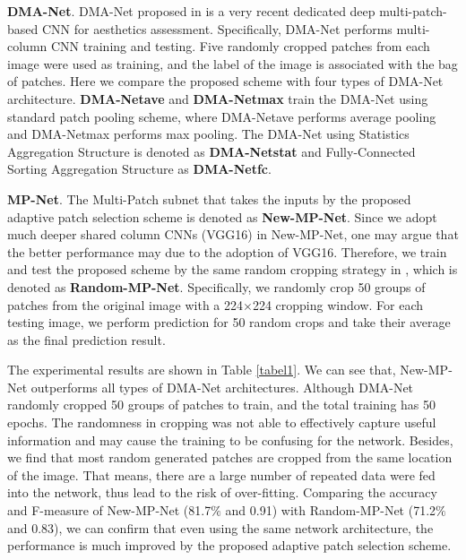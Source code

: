 \documentclass[10pt,twocolumn,letterpaper]{article}
\begin{document}
\textbf{DMA-Net}. DMA-Net proposed in \cite{Lu:2015:ICCV} is a very recent dedicated deep multi-patch-based CNN for aesthetics assessment.
Specifically, DMA-Net performs multi-column CNN training and testing. Five randomly cropped patches from each image were used as training, and the label of the image is associated with the bag of patches. Here we compare the proposed scheme with four types of DMA-Net architecture. \textbf{DMA-Net{\tiny ave}} and \textbf{DMA-Net{\tiny max}} train the DMA-Net using standard patch pooling scheme, where DMA-Net{\tiny ave} performs average pooling and DMA-Net{\tiny max} performs max pooling. The DMA-Net using Statistics Aggregation Structure is denoted as \textbf{DMA-Net{\tiny stat}} and Fully-Connected Sorting Aggregation Structure as \textbf{DMA-Net{\tiny fc}}. 

\textbf{MP-Net}. The Multi-Patch subnet that takes the inputs by the proposed adaptive patch selection scheme is denoted as \textbf{New-MP-Net}. Since we adopt much deeper shared column CNNs (VGG16) in New-MP-Net, one may argue that the better performance may due to the adoption of VGG16. Therefore, we train and test the proposed scheme by the same random cropping strategy in \cite{Lu:2015:ICCV}, which is denoted as \textbf{Random-MP-Net}. Specifically, we randomly crop 50 groups of patches from the original image with a 224$\times$224 cropping window. For each testing image, we perform prediction for 50 random crops and take their average as the final prediction result. 

The experimental results are shown in Table \ref{tabel1}. We can see that, New-MP-Net outperforms all types of DMA-Net architectures.
Although DMA-Net randomly cropped 50 groups of patches to train, and the total training has 50 epochs. The randomness in cropping was not able to effectively capture useful information and may cause the training to be confusing for the network. Besides, we find that most random generated patches are cropped from the same location of the image. That means, there are a large number of repeated data were fed into the network, thus lead to the risk of over-fitting. Comparing the accuracy and F-measure of New-MP-Net (81.7$\%$ and 0.91) with Random-MP-Net (71.2$\%$ and 0.83), we can confirm that even using the same network architecture, the performance is much improved by the proposed adaptive patch selection scheme.
\end{document}
